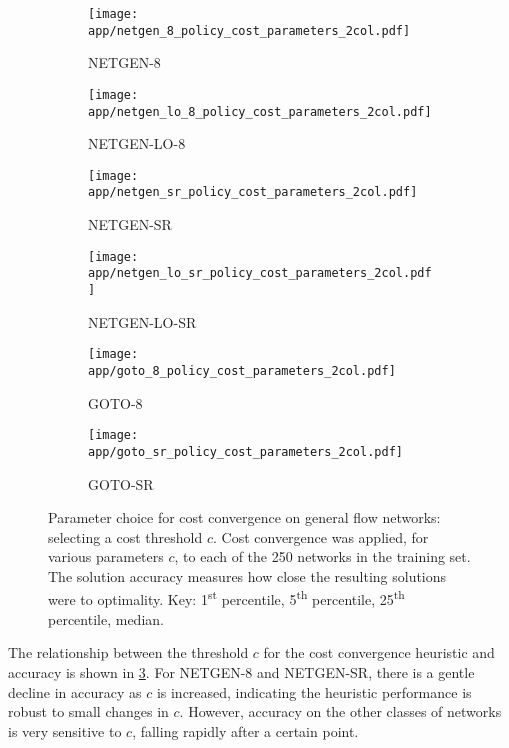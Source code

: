 \begin{figure}
    \begin{widepage}
        \begin{subfigure}[c]{0.5\textwidth}
            \texttt{[image: app/netgen\_8\_policy\_cost\_parameters\_2col.pdf]}
            \caption{NETGEN-8}
        \end{subfigure}
        \begin{subfigure}[c]{0.5\textwidth}
            \texttt{[image: app/netgen\_lo\_8\_policy\_cost\_parameters\_2col.pdf]}
            \caption{NETGEN-LO-8}
            \label{fig:app-general-cost-parameters:netgen-lo-8}
        \end{subfigure}
        \begin{subfigure}[c]{0.5\textwidth}
            \texttt{[image: app/netgen\_sr\_policy\_cost\_parameters\_2col.pdf]}
            \caption{NETGEN-SR}
        \end{subfigure}
        \begin{subfigure}[c]{0.5\textwidth}
            \texttt{[image: app/netgen\_lo\_sr\_policy\_cost\_parameters\_2col.pdf]}
            \caption{NETGEN-LO-SR}
            \label{fig:app-general-cost-parameters:netgen-lo-sr}
        \end{subfigure}
        \begin{subfigure}[c]{0.5\textwidth}
            \texttt{[image: app/goto\_8\_policy\_cost\_parameters\_2col.pdf]}
            \caption{GOTO-8}
        \end{subfigure}
        \begin{subfigure}[c]{0.5\textwidth}
            \texttt{[image: app/goto\_sr\_policy\_cost\_parameters\_2col.pdf]}
            \caption{GOTO-SR}
        \end{subfigure}
    \end{widepage}
    \caption[Parameter choice for cost convergence on general flow networks]{Parameter choice for cost convergence on general flow networks: selecting a cost threshold $c$. Cost convergence was applied, for various parameters $c$, to each of the 250 networks in the training set. The solution accuracy measures how close the resulting solutions were to optimality. Key: {\color{matplotlib_blue} 1\textsuperscript{st} percentile}, {\color{matplotlib_green} 5\textsuperscript{th} percentile}, {\color{matplotlib_red} 25\textsuperscript{th} percentile}, {\color{matplotlib_cyan} median}.}
    \label{fig:app-general-cost-parameters}
\end{figure}

The relationship between the threshold $c$ for the cost convergence heuristic and accuracy is shown in \cref{fig:app-general-cost-parameters}. For NETGEN-8 and NETGEN-SR, there is a gentle decline in accuracy as $c$ is increased, indicating the heuristic performance is robust to small changes in $c$. However, accuracy on the other classes of networks is very sensitive to $c$, falling rapidly after a certain point.

